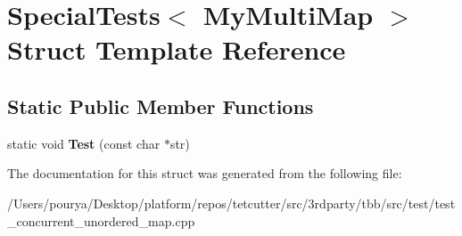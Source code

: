 \hypertarget{structSpecialTests_3_01MyMultiMap_01_4}{}\section{Special\+Tests$<$ My\+Multi\+Map $>$ Struct Template Reference}
\label{structSpecialTests_3_01MyMultiMap_01_4}
\subsection*{Static Public Member Functions}
\begin{DoxyCompactItemize}
\item 
\hypertarget{structSpecialTests_3_01MyMultiMap_01_4_a043781b763dbce6dc15f26eb0f75228a}{}static void {\bfseries Test} (const char $\ast$str)\label{structSpecialTests_3_01MyMultiMap_01_4_a043781b763dbce6dc15f26eb0f75228a}

\end{DoxyCompactItemize}


The documentation for this struct was generated from the following file\+:\begin{DoxyCompactItemize}
\item 
/\+Users/pourya/\+Desktop/platform/repos/tetcutter/src/3rdparty/tbb/src/test/test\+\_\+concurrent\+\_\+unordered\+\_\+map.\+cpp\end{DoxyCompactItemize}
